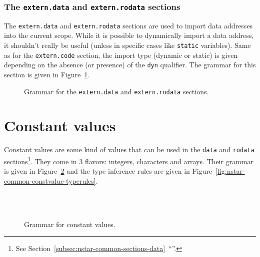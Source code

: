 \subsubsection{The \texttt{extern.data} and \texttt{extern.rodata} sections}\label{subsubsec:nstar-common-sections-extern-data}

The \texttt{extern.data} and \texttt{extern.rodata} sections are used to import data addresses into the current scope.
While it is possible to dynamically import a data address, it shouldn't really be useful (unless in specific cases like \texttt{static} variables).
Same as for the \texttt{extern.code} section, the import type (dynamic or static) is given depending on the absence (or presence) of the \texttt{dyn} qualifier.
The grammar for this section is given in Figure~\ref{fig:nstar-common-sections-extern-data-grammar}.

\begin{figure}[htb]
  \centering

  \caption{Grammar for the \texttt{extern.data} and \texttt{extern.rodata} sections.}
  \label{fig:nstar-common-sections-extern-data-grammar}
\end{figure}

\section{Constant values}\label{sec:nstar-common-constvalue}

Constant values are some kind of values that can be used in the \texttt{data} and \texttt{rodata} sections\footnote{See Section~\ref{subsec:nstar-common-sections-data}~``''.}.
They come in 3 flavors: integers, characters and arrays.
Their grammar is given in Figure~\ref{fig:nstar-common-constvalue-grammar} and the type inference rules are given in Figure~\ref{fig:nstar-common-constvalue-typerules}.

\begin{figure}[htb]
  \centering
  \\
  \\

  \caption{Grammar for constant values.}
  \label{fig:nstar-common-constvalue-grammar}
\end{figure}

